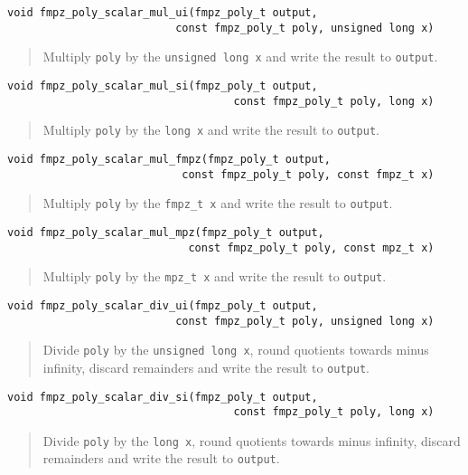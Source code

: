 \documentclass[a4paper,10pt]{article}
\newcommand{\code}{\lstinline}
\begin{document}
\begin{lstlisting}
void fmpz_poly_scalar_mul_ui(fmpz_poly_t output, 
                          const fmpz_poly_t poly, unsigned long x)
\end{lstlisting}
\begin{quote}
Multiply \code{poly} by the \code{unsigned long x} and write the result to \code{output}. 
\end{quote}

\begin{lstlisting}
void fmpz_poly_scalar_mul_si(fmpz_poly_t output, 
                                   const fmpz_poly_t poly, long x)
\end{lstlisting}
\begin{quote}
Multiply \code{poly} by the \code{long x} and write the result to \code{output}. 
\end{quote}

\begin{lstlisting}
void fmpz_poly_scalar_mul_fmpz(fmpz_poly_t output, 
                           const fmpz_poly_t poly, const fmpz_t x) 
\end{lstlisting}
\begin{quote}
Multiply \code{poly} by the \code{fmpz_t x} and write the result to \code{output}. 
\end{quote}

\begin{lstlisting}
void fmpz_poly_scalar_mul_mpz(fmpz_poly_t output, 
                            const fmpz_poly_t poly, const mpz_t x) 
\end{lstlisting}
\begin{quote}
Multiply \code{poly} by the \code{mpz_t x} and write the result to \code{output}. 
\end{quote}

\begin{lstlisting}
void fmpz_poly_scalar_div_ui(fmpz_poly_t output, 
                          const fmpz_poly_t poly, unsigned long x)
\end{lstlisting}
\begin{quote}
Divide \code{poly} by the \code{unsigned long x}, round quotients towards minus infinity, discard remainders and write the result to \code{output}. 
\end{quote}

\begin{lstlisting}
void fmpz_poly_scalar_div_si(fmpz_poly_t output, 
                                   const fmpz_poly_t poly, long x)
\end{lstlisting}
\begin{quote}
Divide \code{poly} by the \code{long x}, round quotients towards minus infinity, discard remainders and write the result to \code{output}.
\end{quote}
\end{document}

